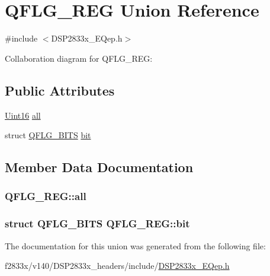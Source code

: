 \hypertarget{union_q_f_l_g___r_e_g}{}\section{Q\+F\+L\+G\+\_\+\+R\+E\+G Union Reference}
\label{union_q_f_l_g___r_e_g}


{\ttfamily \#include $<$D\+S\+P2833x\+\_\+\+E\+Qep.\+h$>$}



Collaboration diagram for Q\+F\+L\+G\+\_\+\+R\+E\+G\+:
\subsection*{Public Attributes}
\begin{DoxyCompactItemize}
\item 
\hyperlink{_d_s_p2833x___device_8h_a59a9f6be4562c327cbfb4f7e8e18f08b}{Uint16} \hyperlink{union_q_f_l_g___r_e_g_a17320dcb8b42603a5b335835be8f85bc}{all}
\item 
struct \hyperlink{struct_q_f_l_g___b_i_t_s}{Q\+F\+L\+G\+\_\+\+B\+I\+T\+S} \hyperlink{union_q_f_l_g___r_e_g_aeff176af7ffea14fb680b0f402c5ad77}{bit}
\end{DoxyCompactItemize}


\subsection{Member Data Documentation}
\hypertarget{union_q_f_l_g___r_e_g_a17320dcb8b42603a5b335835be8f85bc}{}
\subsubsection[{all}]{ Q\+F\+L\+G\+\_\+\+R\+E\+G\+::all}\label{union_q_f_l_g___r_e_g_a17320dcb8b42603a5b335835be8f85bc}
\hypertarget{union_q_f_l_g___r_e_g_aeff176af7ffea14fb680b0f402c5ad77}{}
\subsubsection[{bit}]{\setlength{\rightskip}{0pt plus 5cm}struct {\bf Q\+F\+L\+G\+\_\+\+B\+I\+T\+S} Q\+F\+L\+G\+\_\+\+R\+E\+G\+::bit}\label{union_q_f_l_g___r_e_g_aeff176af7ffea14fb680b0f402c5ad77}


The documentation for this union was generated from the following file\+:\begin{DoxyCompactItemize}
\item 
f2833x/v140/\+D\+S\+P2833x\+\_\+headers/include/\hyperlink{_d_s_p2833x___e_qep_8h}{D\+S\+P2833x\+\_\+\+E\+Qep.\+h}\end{DoxyCompactItemize}
